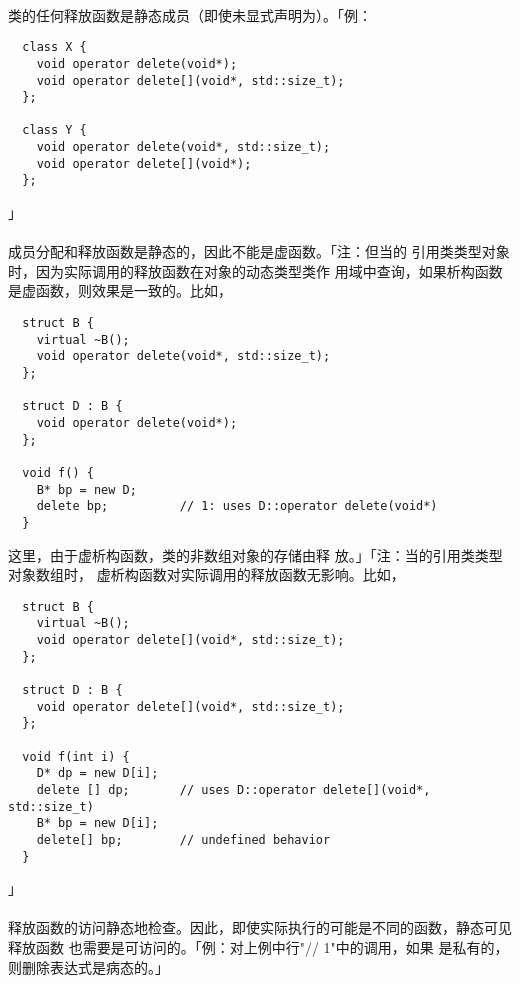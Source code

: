 \paragraph{}
类的任何释放函数是静态成员（即使未显式声明为）。「例：
\begin{lstlisting}
  class X {
    void operator delete(void*);
    void operator delete[](void*, std::size_t);
  };

  class Y {
    void operator delete(void*, std::size_t);
    void operator delete[](void*);
  };
\end{lstlisting}」

\paragraph{}
成员分配和释放函数是静态的，因此不能是虚函数。「注：但当的
引用类类型对象时，因为实际调用的释放函数在对象的动态类型类作
用域中查询，如果析构函数是虚函数，则效果是一致的。比如，
\begin{lstlisting}
  struct B {
    virtual ~B();
    void operator delete(void*, std::size_t);
  };

  struct D : B {
    void operator delete(void*);
  };

  void f() {
    B* bp = new D;
    delete bp;          // 1: uses D::operator delete(void*)
  }
\end{lstlisting}
这里，由于虚析构函数，类的非数组对象的存储由释
放。」「注：当的引用类类型对象数组时，
虚析构函数对实际调用的释放函数无影响。比如，
\begin{lstlisting}
  struct B {
    virtual ~B();
    void operator delete[](void*, std::size_t);
  };

  struct D : B {
    void operator delete[](void*, std::size_t);
  };

  void f(int i) {
    D* dp = new D[i];
    delete [] dp;       // uses D::operator delete[](void*, std::size_t)
    B* bp = new D[i];
    delete[] bp;        // undefined behavior
  }
\end{lstlisting}」

\paragraph{}
释放函数的访问静态地检查。因此，即使实际执行的可能是不同的函数，静态可见释放函数
也需要是可访问的。「例：对上例中行"// 1"中的调用，如果
是私有的，则删除表达式是病态的。」

